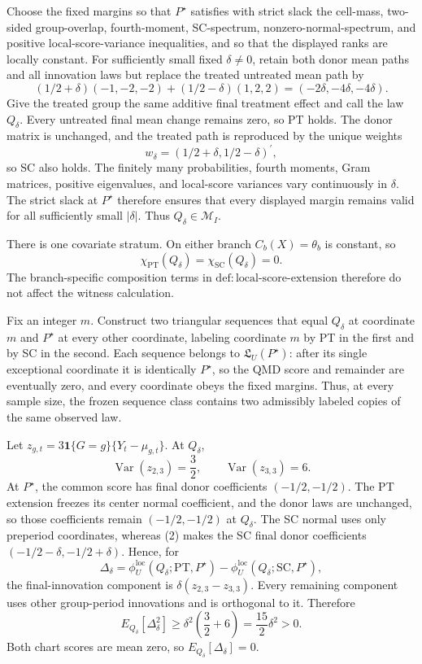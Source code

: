 Choose the fixed margins so that \(P^{\star}\) satisfies with strict slack the cell-mass, two-sided group-overlap, fourth-moment, SC-spectrum, nonzero-normal-spectrum, and positive local-score-variance inequalities, and so that the displayed ranks are locally constant.  For sufficiently small fixed \(\delta\ne0\), retain both donor mean paths and all innovation laws but replace the treated untreated mean path by
\[
 (1/2+\delta)(-1,-2,-2)+(1/2-\delta)(1,2,2)
 =(-2\delta,-4\delta,-4\delta).
 \tag{1}
\]
Give the treated group the same additive final treatment effect and call the law \(Q_\delta\).  Every untreated final mean change remains zero, so PT holds.  The donor matrix is unchanged, and the treated path is reproduced by the unique weights
\[
 w_\delta=(1/2+\delta,1/2-\delta)^{\prime},
 \tag{2}
\]
so SC also holds.  The finitely many probabilities, fourth moments, Gram matrices, positive eigenvalues, and local-score variances vary continuously in \(\delta\).  The strict slack at \(P^{\star}\) therefore ensures that every displayed margin remains valid for all sufficiently small \(|\delta|\).  Thus \(Q_\delta\in\mathcal M_I\).

There is one covariate stratum.  On either branch \(C_b(X)=\theta_b\) is constant, so
\[
 \chi_{\mathrm{PT}}(Q_\delta)=\chi_{\mathrm{SC}}(Q_\delta)=0.
 \tag{3}
\]
The branch-specific composition terms in \(\mathrm{def{:}local\text{-}score\text{-}extension}\) therefore do not affect the witness calculation.

Fix an integer \(m\).  Construct two triangular sequences that equal \(Q_\delta\) at coordinate \(m\) and \(P^{\star}\) at every other coordinate, labeling coordinate \(m\) by PT in the first and by SC in the second.  Each sequence belongs to \(\mathfrak L_U(P^{\star})\): after its single exceptional coordinate it is identically \(P^{\star}\), so the QMD score and remainder are eventually zero, and every coordinate obeys the fixed margins.  Thus, at every sample size, the frozen sequence class contains two admissibly labeled copies of the same observed law.

Let \(z_{g,t}=3\mathbf 1\{G=g\}\{Y_t-\mu_{g,t}\}\).  At \(Q_\delta\),
\[
 \operatorname{Var}(z_{2,3})=\frac32,
 \qquad
 \operatorname{Var}(z_{3,3})=6.
 \tag{4}
\]
At \(P^{\star}\), the common score has final donor coefficients \((-1/2,-1/2)\).  The PT extension freezes its center normal coefficient, and the donor laws are unchanged, so those coefficients remain \((-1/2,-1/2)\) at \(Q_\delta\).  The SC normal uses only preperiod coordinates, whereas (2) makes the SC final donor coefficients \((-1/2-\delta,-1/2+\delta)\).  Hence, for
\[
 \Delta_\delta
 =\phi_U^{\mathrm{loc}}(Q_\delta;\mathrm{PT},P^{\star})
 -\phi_U^{\mathrm{loc}}(Q_\delta;\mathrm{SC},P^{\star}),
 \tag{5}
\]
the final-innovation component is \(\delta(z_{2,3}-z_{3,3})\).  Every remaining component uses other group-period innovations and is orthogonal to it.  Therefore
\[
 E_{Q_\delta}[\Delta_\delta^2]
 \ge\delta^2\left(\frac32+6\right)
 =\frac{15}{2}\delta^2>0.
 \tag{6}
\]
Both chart scores are mean zero, so \(E_{Q_\delta}[\Delta_\delta]=0\).


